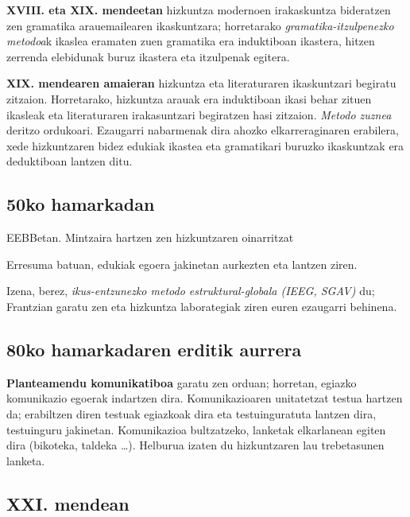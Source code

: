 \documentclass[
]{book}
\providecommand{\tightlist}{%
  \setlength{\itemsep}{0pt}\setlength{\parskip}{0pt}}
\begin{document}
\textbf{XVIII. eta XIX. mendeetan} hizkuntza modernoen irakaskuntza bideratzen zen gramatika arauemailearen ikaskuntzara; horretarako \emph{gramatika-itzulpenezko metodoa}k ikaslea eramaten zuen gramatika era induktiboan ikastera, hitzen zerrenda elebidunak buruz ikastera eta itzulpenak egitera.

\textbf{XIX. mendearen amaieran} hizkuntza eta literaturaren ikaskuntzari begiratu zitzaion. Horretarako, hizkuntza arauak era induktiboan ikasi behar zituen ikasleak eta literaturaren irakasuntzari begiratzen hasi zitzaion. \emph{Metodo zuznea} deritzo ordukoari. Ezaugarri nabarmenak dira ahozko elkarreraginaren erabilera, xede hizkuntzaren bidez edukiak ikastea eta gramatikari buruzko ikaskuntzak era deduktiboan lantzen ditu.

\hypertarget{ko-hamarkadan}{%
\subsection{50ko hamarkadan}\label{ko-hamarkadan}}

\begin{description}
\tightlist
\item[Metodo audiolinguala]
EEBBetan. Mintzaira hartzen zen hizkuntzaren oinarritzat
\item[Metodo situazionala]
Erresuma batuan, edukiak egoera jakinetan aurkezten eta lantzen ziren.
\item[Metodo estruktural-globala]
Izena, berez, \emph{ikus-entzunezko metodo estruktural-globala (IEEG, SGAV)} du; Frantzian garatu zen eta hizkuntza laborategiak ziren euren ezaugarri behinena.
\end{description}

\hypertarget{ko-hamarkadaren-erditik-aurrera}{%
\subsection{80ko hamarkadaren erditik aurrera}\label{ko-hamarkadaren-erditik-aurrera}}

\textbf{Planteamendu komunikatiboa} garatu zen orduan; horretan, egiazko komunikazio egoerak indartzen dira. Komunikazioaren unitatetzat testua hartzen da; erabiltzen diren testuak egiazkoak dira eta testuinguratuta lantzen dira, testuinguru jakinetan. Komunikazioa bultzatzeko, lanketak elkarlanean egiten dira (bikoteka, taldeka \ldots). Helburua izaten du hizkuntzaren lau trebetasunen lanketa.

\hypertarget{xxi.-mendean}{%
\subsection{XXI. mendean}\label{xxi.-mendean}}
\end{document}
